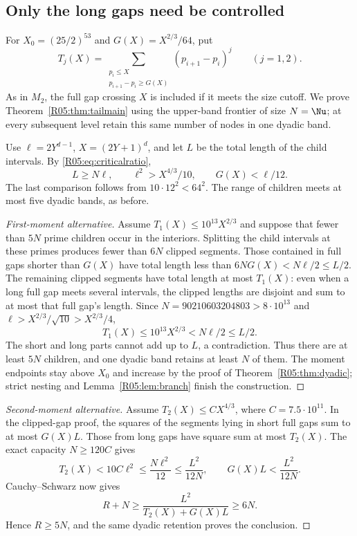\documentclass[11pt,a4paper]{article}
\theoremstyle{definition}\newtheorem{definition}[theorem]{Definition}
\theoremstyle{remark}\newtheorem{remark}[theorem]{Remark}
\begin{document}
\subsection{Only the long gaps need be controlled}
\label{R05:sec:tails}

For $X_0=(25/2)^{53}$ and $G(X)=X^{2/3}/64$, put
\[
 T_j(X)=\sum_{\substack{p_i\le X\\p_{i+1}-p_i\ge G(X)}}
       (p_{i+1}-p_i)^j\qquad(j=1,2).
\]
As in $M_2$, the full gap crossing $X$ is included if it meets the
size cutoff. We prove Theorem~\ref{R05:thm:tailmain} using the upper-band
frontier of size $N=\Nu$; at every subsequent level retain this same
number of nodes in one dyadic band.

Use $\ell=2Y^{d-1}$, $X=(2Y+1)^d$, and let $L$ be the total length
of the child intervals. By \eqref{R05:eq:criticalratio},
\[
 L\ge N\ell,\qquad \ell^2>X^{4/3}/10,\qquad G(X)<\ell/12.
\]
The last comparison follows from $10\cdot12^2<64^2$.
The range of children meets at most five dyadic bands, as before.

\begin{proof}[First-moment alternative]
Assume $T_1(X)\le10^{13}X^{2/3}$ and suppose that fewer than $5N$
prime children occur in the interiors. Splitting the child intervals
at these primes produces fewer than $6N$ clipped segments.
Those contained in full gaps shorter than $G(X)$ have total length
less than $6NG(X)<N\ell/2\le L/2$.
The remaining clipped segments have total length at most $T_1(X)$:
even when a long full gap meets several intervals, the clipped
lengths are disjoint and sum to at most that full gap's length.
Since $N=90210603204803>8\cdot10^{13}$ and
$\ell>X^{2/3}/\sqrt{10}>X^{2/3}/4$,
\[
 T_1(X)\le10^{13}X^{2/3}<N\ell/2\le L/2.
\]
The short and long parts cannot add up to $L$, a contradiction.
Thus there are at least $5N$ children, and one dyadic band retains
at least $N$ of them. The moment endpoints stay above $X_0$ and
increase by the proof of Theorem~\ref{R05:thm:dyadic}; strict nesting and
Lemma~\ref{R05:lem:branch} finish the construction.
\end{proof}

\begin{proof}[Second-moment alternative]
Assume $T_2(X)\le C X^{4/3}$, where $C=7.5\cdot10^{11}$.
In the clipped-gap proof, the squares of the segments lying in
short full gaps sum to at most $G(X)L$. Those from long gaps have
square sum at most $T_2(X)$. The exact capacity $N\ge120C$ gives
\[
 T_2(X)<10C\ell^2\le\frac{N\ell^2}{12}
       \le\frac{L^2}{12N},\qquad
 G(X)L<\frac{L^2}{12N}.
\]
Cauchy--Schwarz now gives
\[
 R+N\ge\frac{L^2}{T_2(X)+G(X)L}\ge6N.
\]
Hence $R\ge5N$, and the same dyadic retention proves the conclusion.
\end{proof}
\end{document}
